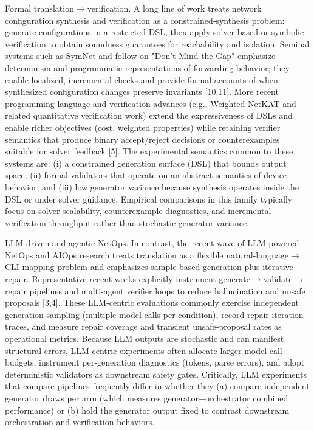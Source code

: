 \documentclass[conference]{IEEEtran}
\begin{document}
Formal translation\ensuremath{\rightarrow}verification. A long line of work treats network configuration synthesis and verification as a constrained‑synthesis problem: generate configurations in a restricted DSL, then apply solver‑based or symbolic verification to obtain soundness guarantees for reachability and isolation. Seminal systems such as SymNet and follow‑on "Don't Mind the Gap" emphasize determinism and programmatic representations of forwarding behavior; they enable localized, incremental checks and provide formal accounts of when synthesized configuration changes preserve invariants [10,11]. More recent programming‑language and verification advances (e.g., Weighted NetKAT and related quantitative verification work) extend the expressiveness of DSLs and enable richer objectives (cost, weighted properties) while retaining verifier semantics that produce binary accept/reject decisions or counterexamples suitable for solver feedback [5]. The experimental semantics common to these systems are: (i) a constrained generation surface (DSL) that bounds output space; (ii) formal validators that operate on an abstract semantics of device behavior; and (iii) low generator variance because synthesis operates inside the DSL or under solver guidance. Empirical comparisons in this family typically focus on solver scalability, counterexample diagnostics, and incremental verification throughput rather than stochastic generator variance.

LLM‑driven and agentic NetOps. In contrast, the recent wave of LLM‑powered NetOps and AIOps research treats translation as a flexible natural‑language\ensuremath{\rightarrow}CLI mapping problem and emphasizes sample‑based generation plus iterative repair. Representative recent works explicitly instrument generate\ensuremath{\rightarrow}validate\ensuremath{\rightarrow}repair pipelines and multi‑agent verifier loops to reduce hallucination and unsafe proposals [3,4]. These LLM‑centric evaluations commonly exercise independent generation sampling (multiple model calls per condition), record repair iteration traces, and measure repair coverage and transient unsafe‑proposal rates as operational metrics. Because LLM outputs are stochastic and can manifest structural errors, LLM‑centric experiments often allocate larger model‑call budgets, instrument per‑generation diagnostics (tokens, parse errors), and adopt deterministic validators as downstream safety gates. Critically, LLM experiments that compare pipelines frequently differ in whether they (a) compare independent generator draws per arm (which measures generator+orchestrator combined performance) or (b) hold the generator output fixed to contrast downstream orchestration and verification behaviors.
\end{document}
